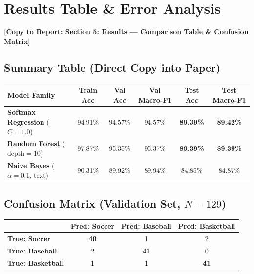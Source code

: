 \documentclass[11pt,a4paper]{article}
\newcommand{\reporttag}[1]{%
  \vspace{0.4em}\noindent\colorbox{tagblue!10}{\textbf{\textcolor{tagblue}{[Copy to Report: #1]}}}\vspace{0.2em}%
}
\begin{document}
\section{Results Table \& Error Analysis}
\reporttag{Section 5: Results --- Comparison Table \& Confusion Matrix}

\subsection{Summary Table (Direct Copy into Paper)}
\begin{center}
\small
\begin{tabular*}{\textwidth}{@{\extracolsep{\fill}}lccccc@{}}
\toprule
\textbf{Model Family} & \textbf{Train Acc} & \textbf{Val Acc} & \textbf{Val Macro-F1} & \textbf{Test Acc} & \textbf{Test Macro-F1} \\
\midrule
\textbf{Softmax Regression} ($C=1.0$) & 94.91\% & 94.57\% & 94.57\% & \textbf{89.39\%} & \textbf{89.42\%} \\
\textbf{Random Forest} ($\text{depth}=10$) & 97.87\% & 95.35\% & 95.37\% & \textbf{89.39\%} & \textbf{89.39\%} \\
\textbf{Naive Bayes} ($\alpha=0.1$, text) & 90.31\% & 89.92\% & 89.94\% & 84.85\% & 84.87\% \\
\bottomrule
\end{tabular*}
\end{center}

\subsection{Confusion Matrix (Validation Set, $N=129$)}
\begin{center}
\small
\begin{tabular}{lccc}
\toprule
& \textbf{Pred: Soccer} & \textbf{Pred: Baseball} & \textbf{Pred: Basketball} \\
\midrule
\textbf{True: Soccer} & \textbf{40} & 1 & 2 \\
\textbf{True: Baseball} & 2 & \textbf{41} & 0 \\
\textbf{True: Basketball} & 1 & 1 & \textbf{41} \\
\bottomrule
\end{tabular}
\end{center}
\end{document}
